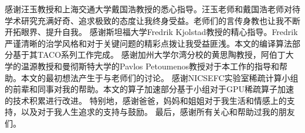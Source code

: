 
\begin{acknowledgements}
  感谢汪玉教授和上海交通大学戴国浩教授的悉心指导。汪玉老师和戴国浩老师对待学术研究充满好奇、追求极致的态度让我终身受益。老师们的言传身教也让我不断开拓眼界、提升自我。
  感谢斯坦福大学Fredrik Kjolstad教授的精心指导。Fredrik严谨清晰的治学风格和对于关键问题的精彩点拨让我受益匪浅。本文的编译算法部分基于其TACO系列工作完成。
  感谢加州大学尔湾分校的黄思陶教授，阿伯丁大学的温源教授和曼彻斯特大学的Pavlos Petoumenos教授对于本工作的指导和帮助。本文的最初想法产生于与老师们的讨论。
  感谢NICSEFC实验室稀疏计算小组的前辈和同事对我的帮助。本文的算子加速部分基于小组对于GPU稀疏算子加速的技术积累进行改进。
  特别地，感谢爸爸，妈妈和姐姐对于我生活和情感上的支持，以及对于我人生追求的支持与鼓励。
  最后，感谢所有关心和帮助过我的朋友们。
\end{acknowledgements}
